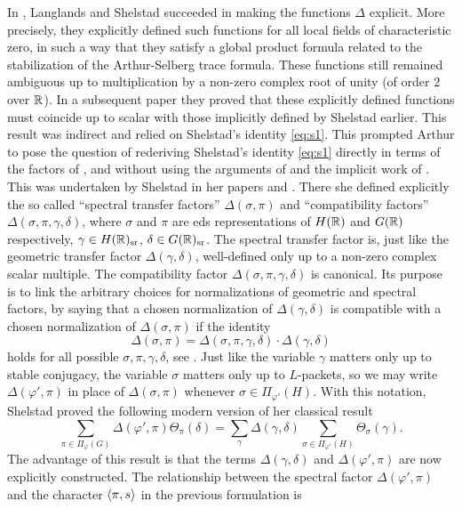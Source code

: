 \documentclass{article}
\theoremstyle{definition}
\numberwithin{equation}{section}
\renewcommand{\-}{\hyp{}}
\begin{document}
In \cite{LS87}, Langlands and Shelstad succeeded in making the functions $\Delta$ explicit. More precisely, they explicitly defined such functions for all local fields of characteristic zero, in such a way that they satisfy a global product formula related to the stabilization of the Arthur-Selberg trace formula. These functions still remained ambiguous up to multiplication by a non-zero complex root of unity (of order $2$ over $\mathbb{R}$). In a subsequent paper \cite[Theorem 2.6.A]{LS90} they proved that these explicitly defined functions must coincide up to scalar with those implicitly defined by Shelstad earlier. This result was indirect and relied on Shelstad's identity \eqref{eq:s1}. This prompted Arthur to pose the question \cite{Art08} of rederiving Shelstad's identity \eqref{eq:s1} directly in terms of the factors of \cite{LS87}, and without using the arguments of \cite{LS90} and the implicit work of \cite{She82}. This was undertaken by Shelstad in her papers \cite{SheTE1} and \cite{SheTE2}. There she defined  explicitly the so called ``spectral transfer factors'' $\Delta(\sigma,\pi)$ and ``compatibility factors'' $\Delta(\sigma,\pi,\gamma,\delta)$, where $\sigma$ and $\pi$ are eds representations of $H(\mathbb{R})$ and $G(\mathbb{R})$ respectively, $\gamma \in H(\mathbb{R})_{\textrm{sr}}$, $\delta \in G(\mathbb{R})_{\textrm{sr}}$. The spectral transfer factor is, just like the geometric transfer factor $\Delta(\gamma,\delta)$, well-defined only up to a non-zero complex scalar multiple. The compatibility factor $\Delta(\sigma,\pi,\gamma,\delta)$ is canonical. Its purpose is to link the arbitrary choices for normalizations of geometric and spectral factors, by saying that a chosen normalization of $\Delta(\gamma,\delta)$ is compatible with a chosen normalization of $\Delta(\sigma,\pi)$ if the identity
\[ \Delta(\sigma,\pi)  = \Delta(\sigma,\pi,\gamma,\delta) \cdot \Delta(\gamma,\delta) \]
holds for all possible $\sigma,\pi,\gamma,\delta$, see \cite[\S4]{SheTE2}. Just like the variable $\gamma$ matters only up to stable conjugacy, the variable $\sigma$ matters only up to $L$\-packets, so we may write $\Delta(\varphi',\pi)$ in place of $\Delta(\sigma,\pi)$ whenever $\sigma \in \Pi_{\varphi'}(H)$. With this notation, Shelstad proved the following modern version of her classical result
\begin{equation} \label{eq:s2}
	\sum_{\pi \in \Pi_\varphi(G)}\Delta(\varphi',\pi)\Theta_\pi(\delta) = \sum_\gamma \Delta(\gamma,\delta)\sum_{\sigma \in \Pi_{\varphi'}(H)} \Theta_{\sigma}(\gamma).
\end{equation}
The advantage of this result is that the terms $\Delta(\gamma,\delta)$ and $\Delta(\varphi',\pi)$ are now explicitly constructed. The relationship between the spectral factor $\Delta(\varphi',\pi)$ and the character $\langle\pi,s\rangle$ in the previous formulation is
\end{document}
